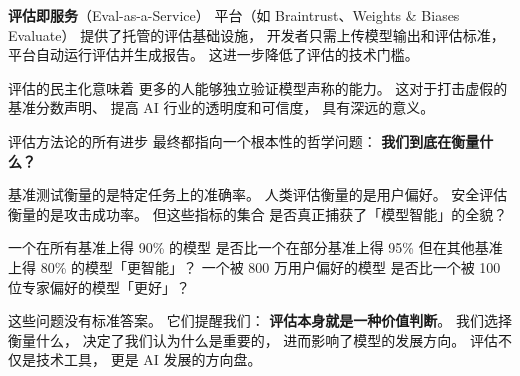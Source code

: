 \textbf{评估即服务}（Eval-as-a-Service）
平台（如 Braintrust、Weights \& Biases Evaluate）
提供了托管的评估基础设施，
开发者只需上传模型输出和评估标准，
平台自动运行评估并生成报告。
这进一步降低了评估的技术门槛。

评估的民主化意味着
更多的人能够独立验证模型声称的能力。
这对于打击虚假的基准分数声明、
提高 AI 行业的透明度和可信度，
具有深远的意义。

\begin{corebox}[评估的终极问题]
评估方法论的所有进步
最终都指向一个根本性的哲学问题：
\textbf{我们到底在衡量什么？}

基准测试衡量的是特定任务上的准确率。
人类评估衡量的是用户偏好。
安全评估衡量的是攻击成功率。
但这些指标的集合
是否真正捕获了「模型智能」的全貌？

一个在所有基准上得 90\% 的模型
是否比一个在部分基准上得 95\%
但在其他基准上得 80\% 的模型「更智能」？
一个被 800 万用户偏好的模型
是否比一个被 100 位专家偏好的模型「更好」？

这些问题没有标准答案。
它们提醒我们：
\textbf{评估本身就是一种价值判断}。
我们选择衡量什么，
决定了我们认为什么是重要的，
进而影响了模型的发展方向。
评估不仅是技术工具，
更是 AI 发展的方向盘。
\end{corebox}



